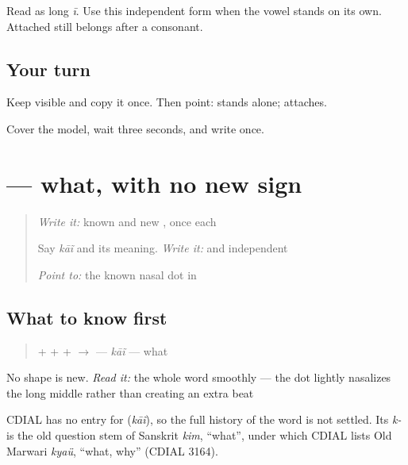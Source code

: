 \begin{quote}
\end{quote}

Read \textbf{} as long \emph{ī}. Use this independent form when the vowel stands on its own. Attached \textbf{} still belongs after a consonant.

\subsection*{Your turn}
Keep \textbf{} visible and copy it once. Then point: \textbf{} stands alone; \textbf{} attaches.

\begin{tcolorbox}[breakable,colback=teal!4,colframe=teal!35!black,title={Before you move on}]
Cover the model, wait three seconds, and write \textbf{} once.
\end{tcolorbox}
\section[\texorpdfstring{\mw{कांई} (kāĩ)}{कांई (kāĩ)}]{ — what, with no new sign}

\label{lesson:MW-C05-kain}



\begin{quote}
\emph{Write it:} known \textbf{} and new \textbf{}, once each

Say \emph{kāĩ} and its meaning. \emph{Write it:} \textbf{} and independent \textbf{}

\emph{Point to:} the known nasal dot in \textbf{}
\end{quote}

\subsection*{What to know first}
\begin{quote}
\textbf{} + \textbf{} + \textbf{} + \textbf{} $\to$ \textbf{} — \emph{kāĩ} — what
\end{quote}

No shape is new. \emph{Read it:} the whole word smoothly — the dot lightly nasalizes the long middle rather than creating an extra beat

\begin{cousinweb}
CDIAL has no entry for \textbf{} (\emph{kāĩ}), so the full history of the word is not settled. Its \emph{k-} is the old question stem of Sanskrit \emph{kim}, \textquotedblleft{}what\textquotedblright{}, under which CDIAL lists Old Marwari \emph{kyaü}, \textquotedblleft{}what, why\textquotedblright{} (CDIAL 3164).
\end{cousinweb}

